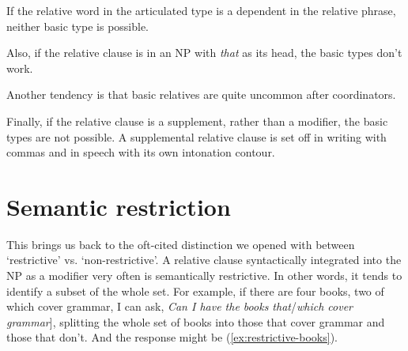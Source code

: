 If the relative word in the articulated type is a dependent in the relative phrase, neither basic type is possible.

\ea
    \z
\z
\ea
    \z
\z

Also, if the relative clause is in an NP with \textit{that} as its head, the basic types don't work.

\ea
    \z
\z

Another tendency is that basic relatives are quite uncommon after coordinators.

\ea
    \z
\z

Finally, if the relative clause is a supplement, rather than a modifier, the basic types are not possible. A supplemental relative clause is set off in writing with commas and in speech with its own intonation contour.

\ea
    \z
\z

\section{Semantic restriction}
This brings us back to the oft-cited distinction we opened with between `restrictive' vs. `non-restrictive'. A relative clause syntactically integrated into the NP as a modifier very often is semantically restrictive. In other words, it tends to identify a subset of the whole set. For example, if there are four books, two of which cover grammar, I can ask, \textit{Can I have the books \ob that}/\textit{which cover grammar}], splitting the whole set of books into those that cover grammar and those that don't. And the response might be (\ref{ex:restrictive-books}).


